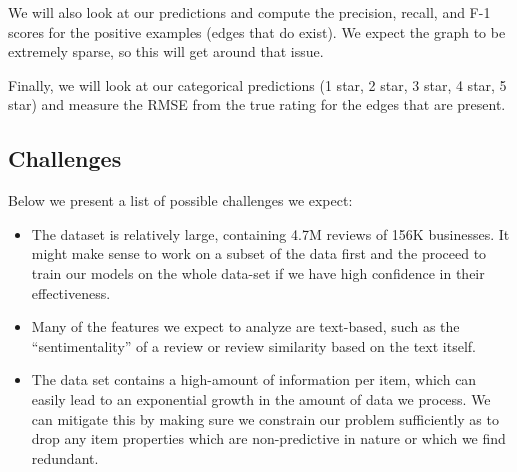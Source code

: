 \documentclass[letterpaper, 11 pt, conference]{ieeeconf}  %
\begin{document}
We will also look at our predictions and compute the precision, recall, and F-1 scores for the positive examples (edges that do exist). We expect the graph to be extremely sparse, so this will get around that issue.

Finally, we will look at our categorical predictions (1 star, 2 star, 3 star, 4 star, 5 star) and measure the RMSE from the true rating for the edges that are present.

\subsection{Challenges}

Below we present a list of possible challenges we expect:

\begin{itemize}
\item The dataset is relatively large, containing 4.7M reviews of 156K businesses. It might make sense to work on a subset of the data first and the proceed to train our models on the whole data-set if we have high confidence in their effectiveness.
\item Many of the features we expect to analyze are text-based, such as the ``sentimentality'' of a review or review similarity based on the text itself. 
\item The data set contains a high-amount of information per item, which can easily lead to an exponential growth in the amount of data we process. We can mitigate this by making sure we constrain our problem sufficiently as to drop any item properties which are non-predictive in nature or which we find redundant.
\end{itemize}

{}

\end{document}

